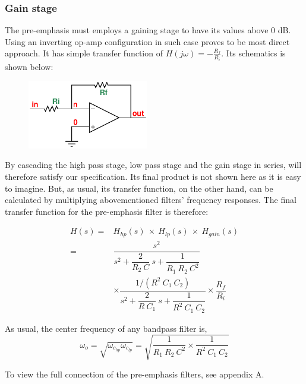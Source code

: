 \documentclass[a4paper]{IEEEtran}
\newcommand{\inv}[1]{\dfrac{1}{#1}}
\begin{document}
			\subsubsection{Gain stage}
				The pre-emphasis must employs a gaining stage to have its values above 0 dB. Using an inverting op-amp configuration in such case proves to be most direct approach. It has simple transfer function of $H(j\omega) = -\tfrac{R_f}{R_i}$. Its schematics is shown below:
				\begin{figure}[h!]
					\begin{center}
						\includegraphics[width=200px]{gain.eps}
					\end{center}
				\end{figure}
			
			By cascading the high pass stage, low pass stage and the gain stage in series, will therefore satisfy our specification. Its final product is not shown here as it is easy to imagine. But, as usual, its transfer function, on the other hand, can be calculated by multiplying abovementioned filters' frequency responses. The final transfer function for the pre-emphasis filter is therefore:
			
			\begin{align}
				H(s) = & H_{hp}(s)~\times~H_{lp}(s)~\times~H_{gain}(s) \\
				= & \dfrac{s^2}{s^2+\dfrac{2}{R_2~C}~s+\inv{R_1~R_2~C^2}} \\ & \times \dfrac{1/(R^2~C_1~C_2)}{s^2+\dfrac{2}{R~C_1}~s+\inv{R^2~C_1~C_2}} \times \dfrac{R_f}{R_i}
			\end{align}
			
			As usual, the center frequency of any bandpass filter is,
			\begin{equation}
				\omega_o = \sqrt{\omega_{c_{hp}} \omega_{c_{lp}}} = \sqrt{\inv{R_1~R_2~C^2} \times \inv{R^2~C_1~C_2}}
			\end{equation}
			
			To view the full connection of the pre-emphasis filters, see appendix A.
		
\end{document}
